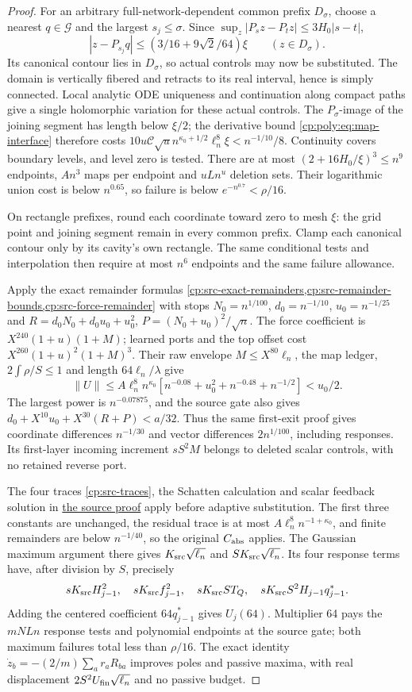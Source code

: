 \begin{proof}
For an arbitrary full-network-dependent common prefix $D_\sigma$,
choose a nearest $q\in\mathscr G$ and the largest $s_j\le\sigma$.
Since $\sup_z|P_sz-P_tz|\le3H_0|s-t|$,
\[
|z-P_{s_j}q|\le(3/16+9\sqrt2/64)\xi\qquad(z\in D_\sigma).
\]
Its canonical contour lies in $D_\sigma$, so actual controls may now
be substituted. The domain is vertically fibered and retracts to its
real interval, hence is simply connected. Local analytic ODE uniqueness
and continuation along compact paths give a single holomorphic variation
for these actual controls. The $P_\sigma$-image of the joining segment
has length below $\xi/2$; the derivative bound
\eqref{cp:poly:eq:map-interface} therefore costs
$10u\mathcal C\sqrt u n^{\kappa_0+1/2}\ell_n^8\xi<n^{-1/10}/8$.
Continuity covers boundary levels, and level zero is tested.
There are at most $(2+16H_0/\xi)^3\le n^9$ endpoints,
$An^3$ maps per endpoint and $uLn^u$ deletion sets. Their logarithmic
union cost is below $n^{0.65}$, so failure is below
$e^{-n^{0.7}}<\rho/16$.

On rectangle prefixes, round each coordinate toward zero to mesh $\xi$:
the grid point and joining segment remain in every common prefix.
Clamp each canonical contour only by its cavity's own rectangle.
The same conditional tests and interpolation then require at most
$n^6$ endpoints and the same failure allowance.

Apply the exact remainder formulas
\cref{cp:src-exact-remainders,cp:src-remainder-bounds,cp:src-force-remainder}
with stops $N_0=n^{1/100}$, $d_0=n^{-1/10}$, $u_0=n^{-1/25}$ and
$R=d_0N_0+d_0u_0+u_0^2$, $P=(N_0+u_0)^2/\sqrt n$.
The force coefficient is $X^{240}(1+u)(1+M)$; learned ports and the
top offset cost $X^{260}(1+u)^2(1+M)^3$.
Their raw envelope $M\le X^{80}\ell_n$, the map ledger,
$2\int\rho/S\le1$ and length $64\ell_n/\lambda$ give
\[
\|U\|\le A\ell_n^8n^{\kappa_0}
 [n^{-0.08}+u_0^2+n^{-0.48}+n^{-1/2}]<u_0/2.
\]
The largest power is $n^{-0.07875}$, and the source gate also gives
$d_0+X^{10}u_0+X^{30}(R+P)<a/32$.
Thus the same first-exit proof gives coordinate differences
$n^{-1/30}$ and vector differences $2n^{1/100}$, including responses.
Its first-layer incoming increment $sS^2M$ belongs to deleted scalar
controls, with no retained reverse port.

The four traces \eqref{cp:src-traces}, the Schatten calculation and
scalar feedback solution in \hyperref[cp:src-moments]{the source proof}
apply before adaptive substitution. The first three constants are
unchanged, the residual trace is at most
$A\ell_n^8n^{-1+\kappa_0}$, and finite remainders are below $n^{-1/40}$,
so the original $C_{\rm abs}$ applies.
The Gaussian maximum argument there gives
$K_{\rm src}\sqrt{\ell_n}$ and $SK_{\rm src}\sqrt{\ell_n}$.
Its four response terms have, after division by $S$, precisely
\[
sK_{\rm src}H_{j-1}^2,\quad sK_{\rm src}f_{j-1}^2,\quad
sK_{\rm src}ST_Q,\quad sK_{\rm src}S^2H_{j-1}q_{j-1}^*.
\]
Adding the centered coefficient $64q_{j-1}^*$ gives $U_j(64)$.
Multiplier 64 pays the $mNLn$ response tests and polynomial endpoints
at the source gate; both maximum failures total less than $\rho/16$.
The exact identity $\dot z_b=-(2/m)\sum_a r_aR_{ba}$ improves poles
and passive maxima, with real displacement
$2S^2U_{\rm fin}\sqrt{\ell_n}$ and no passive budget.


\end{proof}
